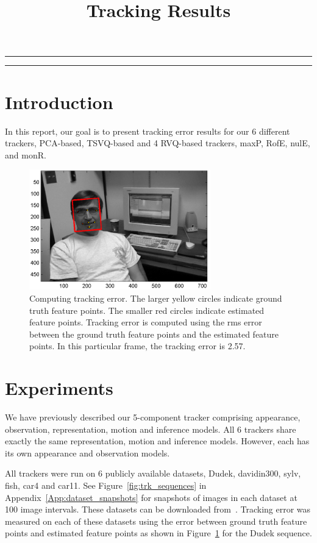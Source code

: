 
\title{Tracking Results}
\date{}

\maketitle
\rule[0pt]{\textwidth}{1pt}
\tableofcontents
\rule[0pt]{\textwidth}{1pt}
\section{Introduction}
In this report, our goal is to present tracking error results for our 6 different trackers, PCA-based, TSVQ-based and 4 RVQ-based trackers, maxP, RofE, nulE, and monR.


								\begin{figure}[t]
								\centering
								\includegraphics[width=0.7\textwidth]{temp/results_pca__trk_dudek_0007.png}
								\caption{Computing tracking error.  The larger yellow circles indicate ground truth feature points.  The smaller red circles indicate estimated feature points.  Tracking error is computed using the rms error between the ground truth feature points and the estimated feature points.  In this particular frame, the tracking error is 2.57.}
								\label{fig:results_pca__trk_dudek_0007}
								\end{figure}
\section{Experiments}
We have previously described our 5-component tracker comprising appearance, observation, representation, motion and inference models.  All 6 trackers share exactly the same representation, motion and inference models.  However, each has its own appearance and observation models.

All trackers were run on 6 publicly available datasets, Dudek, davidin300, sylv, fish, car4 and car11.  See Figure~\ref{fig:trk_sequences} in Appendix~\ref{App:dataset_snapshots} for snapshots of images in each dataset at 100 image intervals.  These datasets can be downloaded from~\cite{2008_JNL_subspaceTRK_Ross}.  Tracking error was measured on each of these datasets using the error between ground truth feature points and estimated feature points as shown in Figure~\ref{fig:results_pca__trk_dudek_0007} for the Dudek sequence.

